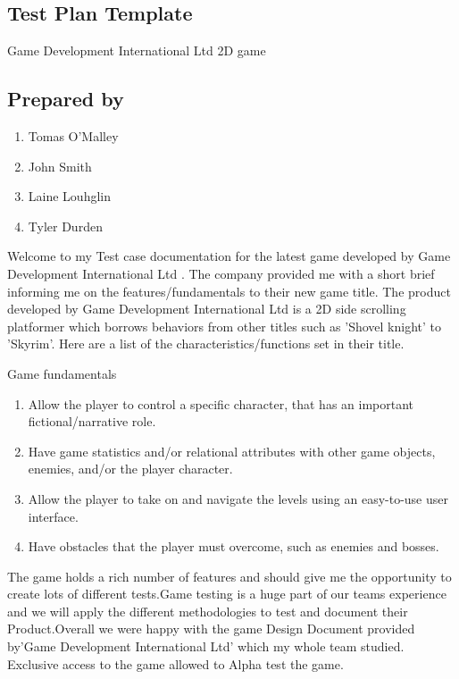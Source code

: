 
\subsection{Test Plan Template}
Game Development International Ltd 2D game 
\subsection{Prepared by }


\begin{enumerate}
  \item Tomas O'Malley
  \item John Smith 
	\item Laine Louhglin 
	\item Tyler Durden 


\end{enumerate}


Welcome to my Test case documentation for the latest game developed by Game Development International Ltd .
The company provided me with a short brief informing me on the features/fundamentals to their new game title.
The product developed by  Game Development International Ltd is a 2D side scrolling platformer which borrows
behaviors from other titles such as 'Shovel knight' to 'Skyrim'. Here are a list of the characteristics/functions
set in their title.

\centerline{Game fundamentals}

\begin{enumerate}
  \item Allow the player to control a specific character, that has an important
fictional/narrative role.
  \item Have game statistics and/or relational attributes with other game objects, enemies,
and/or the player character.

\item Allow the player to take on and navigate the levels using an easy-to-use user
interface.

\item Have obstacles that the player must overcome, such as enemies and bosses.
\end{enumerate}

The game holds a rich number of features and should give me the opportunity to create lots of different tests.Game testing is a huge part of our teams experience and we will apply the different methodologies to test and document their Product.Overall we were happy with the game Design Document provided by'Game Development International Ltd' which my whole team studied. Exclusive access to the game  allowed to Alpha test the game.